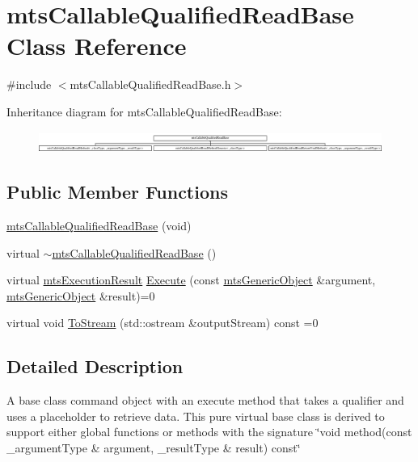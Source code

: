 \hypertarget{classmts_callable_qualified_read_base}{\section{mts\-Callable\-Qualified\-Read\-Base Class Reference}
\label{classmts_callable_qualified_read_base}
}


{\ttfamily \#include $<$mts\-Callable\-Qualified\-Read\-Base.\-h$>$}

Inheritance diagram for mts\-Callable\-Qualified\-Read\-Base\-:\begin{figure}[H]
\begin{center}
\leavevmode
\includegraphics[height=0.707071cm]{d3/db4/classmts_callable_qualified_read_base}
\end{center}
\end{figure}
\subsection*{Public Member Functions}
\begin{DoxyCompactItemize}
\item 
\hyperlink{classmts_callable_qualified_read_base_aadb5cb44dcc5b7bb3ef8c3a9ff56afc3}{mts\-Callable\-Qualified\-Read\-Base} (void)
\item 
virtual \hyperlink{classmts_callable_qualified_read_base_a6f8d3595fd5fb8daa555325c79266e29}{$\sim$mts\-Callable\-Qualified\-Read\-Base} ()
\item 
virtual \hyperlink{classmts_execution_result}{mts\-Execution\-Result} \hyperlink{classmts_callable_qualified_read_base_aca2bad9e0f6976b8ca2207f67358cbf2}{Execute} (const \hyperlink{classmts_generic_object}{mts\-Generic\-Object} \&argument, \hyperlink{classmts_generic_object}{mts\-Generic\-Object} \&result)=0
\item 
virtual void \hyperlink{classmts_callable_qualified_read_base_af01602ea4eb94bf074f6e44ff3db2737}{To\-Stream} (std\-::ostream \&output\-Stream) const =0
\end{DoxyCompactItemize}


\subsection{Detailed Description}
A base class command object with an execute method that takes a qualifier and uses a placeholder to retrieve data. This pure virtual base class is derived to support either global functions or methods with the signature \char`\"{}void method(const \-\_\-argument\-Type \&
argument, \-\_\-result\-Type \& result) const\char`\"{} 

